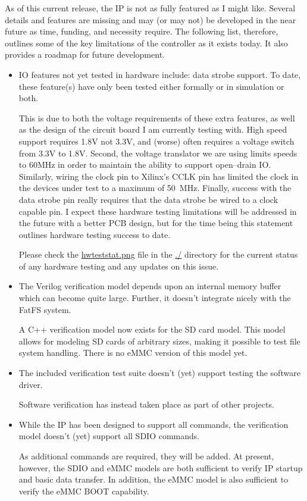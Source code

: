 \documentclass{gqtekspec}
\newcommand{\zhref}[2]{\href{#1}{\textcolor{dkblue}{#2}}}
\begin{document}
As of this current release, the IP is not as fully featured as I might
like.  Several details and features are missing and may (or may not)
be developed in the near future as time, funding, and necessity require.
The following list, therefore, outlines some of the key limitations of the
controller as it exists today.  It also provides a roadmap for future
development.

\begin{itemize}
\item IO features not yet tested in hardware include:
	data strobe support.  To date, these feature(s) have only
	been tested either formally or in simulation or both.

	This is due to both the voltage requirements of these extra features,
	as well as the design of the circuit board I am currently testing with.
	High speed support requires 1.8V not 3.3V, and (worse) often requires a
	voltage switch from 3.3V to 1.8V.  Second, the voltage translator we
	are using limits speeds to 60MHz in order to maintain the ability to
	support open--drain IO.  Similarly, wiring the clock pin to Xilinx's
	CCLK pin has limited the clock in the devices under test to a maximum
	of 50~MHz.  Finally, success with the data strobe pin really requires
	that the data strobe be wired to a clock capable pin.  I expect these
	hardware testing limitations will be addressed in the future with a
	better PCB design, but for the time being this statement outlines
	hardware testing success to date.

	Please check the \zhref{hwteststat.png}{hwteststat.png} file in
	the \zhref{doc/}{./} directory for the current status of any hardware
	testing and any updates on this issue.

\item The Verilog verification model depends upon an internal memory buffer
	which can become quite large.  Further, it doesn't integrate nicely
	with the FatFS system.

	A C++ verification model now exists for the SD card model.  This model
	allows for modeling SD cards of arbitrary sizes, making it possible
	to test file system handling.  There is no eMMC version of this model
	yet.

\item The included verification test suite doesn't (yet) support testing the
	software driver.

	Software verification has instead taken place as part of other
	projects.

\item While the IP has been designed to support all commands, the verification
	model doesn't (yet) support all SDIO commands.

	As additional commands are required, they will be added.  At present,
	however, the SDIO and eMMC models are both sufficient to verify IP
	startup and basic data transfer.  In addition, the eMMC model is also
	sufficient to verify the eMMC BOOT capability.
\end{itemize}
\end{document}
